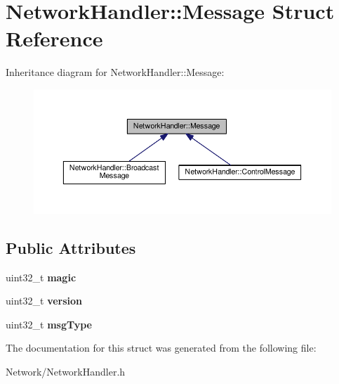 \hypertarget{structNetworkHandler_1_1Message}{}\section{Network\+Handler\+:\+:Message Struct Reference}
\label{structNetworkHandler_1_1Message}


Inheritance diagram for Network\+Handler\+:\+:Message\+:\nopagebreak
\begin{figure}[H]
\begin{center}
\leavevmode
\includegraphics[width=350pt]{structNetworkHandler_1_1Message__inherit__graph}
\end{center}
\end{figure}
\subsection*{Public Attributes}
\begin{DoxyCompactItemize}
\item 
uint32\+\_\+t {\bfseries magic}\hypertarget{structNetworkHandler_1_1Message_a223522c0b8a50767dd4440998a723ce8}{}\label{structNetworkHandler_1_1Message_a223522c0b8a50767dd4440998a723ce8}

\item 
uint32\+\_\+t {\bfseries version}\hypertarget{structNetworkHandler_1_1Message_a806b0186d262219408b53c7137489034}{}\label{structNetworkHandler_1_1Message_a806b0186d262219408b53c7137489034}

\item 
uint32\+\_\+t {\bfseries msg\+Type}\hypertarget{structNetworkHandler_1_1Message_a3a05df44411cb9ac7c8a7842a5afbff4}{}\label{structNetworkHandler_1_1Message_a3a05df44411cb9ac7c8a7842a5afbff4}

\end{DoxyCompactItemize}


The documentation for this struct was generated from the following file\+:\begin{DoxyCompactItemize}
\item 
Network/Network\+Handler.\+h\end{DoxyCompactItemize}
